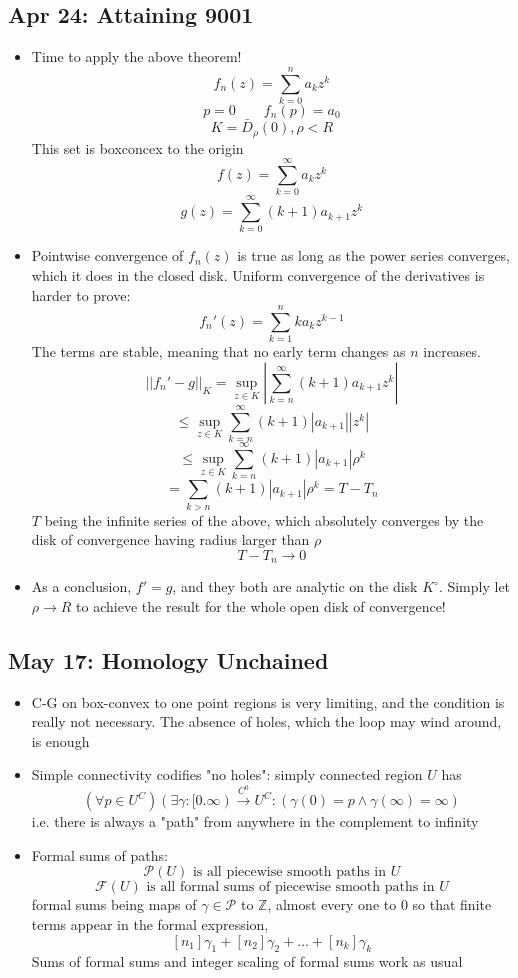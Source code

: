 \documentclass[10pt, oneside]{article}
\let\leq\leqslant
\newcommand{\Z}{\mathbb{Z}}
\begin{document}
\subsection{Apr 24: Attaining 9001}
\begin{itemize}
    \item Time to apply the above theorem!
            \[f_n(z) = \sum_{k=0}^n a_k z^k\]
            \[p = 0 \quad \quad f_n(p) = a_0\]
            \[K = \bar{D}_\rho (0), \rho < R\]
        This set is boxconcex to the origin
            \[f(z) = \sum_{k=0}^\infty a_k z^k\]
            \[g(z) = \sum_{k=0}^\infty (k+1)a_{k+1} z^k\]
    \item Pointwise convergence of $f_n(z)$ is true as long as the power series converges, which it does in the closed disk. Uniform convergence of the derivatives is harder to prove:
            \[f_n'(z) = \sum_{k=1}^n k a_k z^{k-1}\]
        The terms are stable, meaning that no early term changes as $n$ increases. 
            \[||f_n' - g||_K = \sup_{z \in K} \left|\sum_{k=n}^\infty (k+1)a_{k+1}z^k\right|\]
            \[\leq \sup_{z \in K} \sum_{k=n}^\infty (k+1)|a_{k+1}||z^k|\]
            \[\leq \sup_{z \in K} \sum_{k=n}^\infty (k+1)|a_{k+1}|\rho^k\]
            \[= \sum_{k > n} (k+1) |a_{k+1}| \rho^k = T - T_n\]
        $T$ being the infinite series of the above, which absolutely converges by the disk of convergence having radius larger than $\rho$
            \[T - T_n \rightarrow 0\]
    \item As a conclusion, $f' = g$, and they both are analytic on the disk $K^\circ$. Simply let $\rho \rightarrow R$ to achieve the result for the whole open disk of convergence!
\end{itemize}

\subsection{May 17: Homology Unchained}
\begin{itemize}
    \item C-G on box-convex to one point regions is very limiting, and the condition is really not necessary. The absence of holes, which the loop may wind around, is enough
    \item Simple connectivity codifies "no holes": simply connected region $U$ has 
            \[(\forall p \in U^C)(\exists \gamma : [0.\infty) \overset{C^0}{\rightarrow} U^C : (\gamma(0) = p \land \gamma(\infty) = \infty)\]
        i.e. there is always a "path" from anywhere in the complement to infinity
    \item Formal sums of paths:
            \[\mathcal{P}(U) \text{ is all piecewise smooth paths in } U\]
            \[\mathcal{F}(U) \text{ is all formal sums of piecewise smooth paths in } U\]
        formal sums being maps of $\gamma \in \mathcal{P}$ to $\Z$, almost every one to $0$ so that finite terms appear in the formal expression, 
            \[[n_1]\gamma_1 + [n_2]\gamma_2 + \hdots + [n_k]\gamma_k\]
        Sums of formal sums and integer scaling of formal sums work as usual
\end{itemize}
\end{document}
